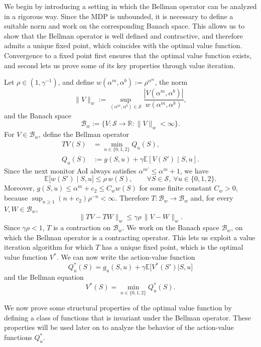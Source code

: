 \documentclass[letterpaper,journal]{IEEEtran}
\begin{document}
We begin by introducing a setting in which the Bellman operator can be analyzed in a rigorous way. Since the MDP is unbounded, it is necessary to define a suitable norm and work on the corresponding Banach space. This allows us to show that the Bellman operator is well defined and contractive, and therefore admits a unique fixed point, which coincides with the optimal value function. Convergence to a fixed point first ensures that the optimal value function exists, and second lets us prove some of its key properties through value iteration.

Let $\rho\in(1,\gamma^{-1})$, and define $w(\alpha^m,\alpha^b):=\rho^{\alpha^m}$, the norm
\[
\|V\|_w:=\sup_{(\alpha^m,\alpha^b)\in\mathcal S}\frac{|V(\alpha^m,\alpha^b)|}{w(\alpha^m,\alpha^b)},
\]
and the Banach space
\[
\mathcal B_w:=\{V:\mathcal S\to\mathbb R:\|V\|_w<\infty\}.
\]
For $V\in\mathcal B_w$, define the Bellman operator
\[
\begin{aligned}
TV(S)&=\min_{u\in\{0,1,2\}} Q_u(S),\\
Q_u(S)&:=g(S,u)+\gamma\mathbb E\left[V(S')\mid S,u\right].
\end{aligned}
\]
Since the next monitor AoI always satisfies $\alpha^{m\prime}\le \alpha^m+1$, we have
\[
\mathbb E\bigl[w(S')\mid S,u\bigr]\le \rho\, w(S),\qquad \forall S\in\mathcal S,\ \forall u\in\{0,1,2\}.
\]
Moreover, $g(S,u)\le \alpha^m+c_2\le C_w w(S)$ for some finite constant $C_w>0$, because $\sup_{n\ge 1}(n+c_2)\rho^{-n}<\infty$. Therefore $T:\mathcal B_w\to\mathcal B_w$ and, for every $V,W\in\mathcal B_w$,
\[
\|TV-TW\|_w\le \gamma\rho\,\|V-W\|_w.
\]
Since $\gamma\rho<1$, $T$ is a contraction on $\mathcal B_w$. We work on the Banach space $\mathcal B_w$, on which the Bellman operator is a contracting operator. This lets us exploit a value iteration algorithm for which $T$ has a unique fixed point, which is the optimal value function $V^*$. We can now write the action-value function
\begin{equation}
    Q^*_u(S)=g_u(S,u)+\gamma\mathbb{E}\bigl[V^*(S')|S,u\bigr]
\end{equation}
and the Bellman equation
\begin{equation}
    V^*(S)=\min_{u\in\{0,1,2\}}Q^*_u(S).
\end{equation}

We now prove some structural properties of the optimal value function by defining a class of functions that is invariant under the Bellman operator. These properties will be used later on to analyze the behavior of the action-value functions $Q_u^*$.
\end{document}
